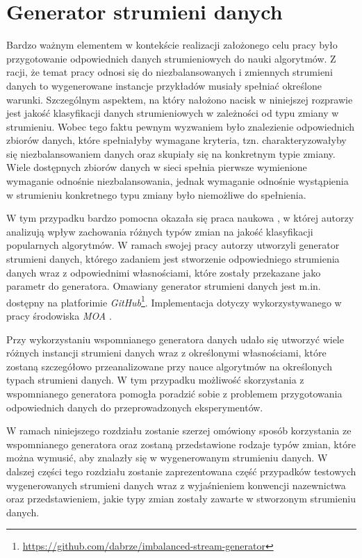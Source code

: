 \chapter{Generator strumieni danych}
\label{Chapter:Generator}

\noindent Bardzo ważnym elementem w kontekście realizacji założonego celu pracy było przygotowanie odpowiednich danych strumieniowych do nauki algorytmów. Z racji, że temat pracy odnosi się do niezbalansowanych i zmiennych strumieni danych to wygenerowane instancje przykładów musiały spełniać określone warunki. Szczególnym aspektem, na który nałożono nacisk w niniejszej rozprawie jest jakość klasyfikacji danych strumieniowych w zależności od typu zmiany w strumieniu. Wobec tego faktu pewnym wyzwaniem było znalezienie odpowiednich zbiorów danych, które spełniałyby wymagane kryteria, tzn. charakteryzowałyby się niezbalansowaniem danych oraz skupiały się na konkretnym typie zmiany. Wiele dostępnych zbiorów danych w sieci spełnia pierwsze wymienione wymaganie odnośnie niezbalansowania, jednak wymaganie odnośnie wystąpienia w strumieniu konkretnego typu zmiany było niemożliwe do spełnienia.

W tym przypadku bardzo pomocna okazała się praca naukowa \cite{Article:TypyPrzykladow}, w której autorzy analizują wpływ zachowania różnych typów zmian na jakość klasyfikacji popularnych algorytmów. W ramach swojej pracy autorzy utworzyli generator strumieni danych, którego zadaniem jest stworzenie odpowiedniego strumienia danych wraz z odpowiednimi własnościami, które zostały przekazane jako parametr do generatora. Omawiany generator strumieni danych jest m.in. dostępny na platforimie \textit{GitHub}\footnote{\url{https://github.com/dabrze/imbalanced-stream-generator}}. Implementacja dotyczy wykorzystywanego w pracy środowiska \textit{MOA} \cite{Article:MOA}.

Przy wykorzystaniu wspomnianego generatora danych udało się utworzyć wiele różnych instancji strumieni danych wraz z określonymi własnościami, które zostaną szczegółowo przeanalizowane przy nauce algorytmów na określonych typach strumieni danych. W tym przypadku możliwość skorzystania z wspomnianego generatora pomogła poradzić sobie z problemem przygotowania odpowiednich danych do przeprowadzonych eksperymentów.

W ramach niniejszego rozdziału zostanie szerzej omówiony sposób korzystania ze wspomnianego generatora oraz zostaną przedstawione rodzaje typów zmian, które można wymusić, aby znalazły się w wygenerowanym strumieniu danych. W dalszej części tego rozdziału zostanie zaprezentowana część przypadków testowych wygenerowanych strumieni danych wraz z wyjaśnieniem konwencji nazewnictwa oraz przedstawieniem, jakie typy zmian zostały zawarte w stworzonym strumieniu danych.

